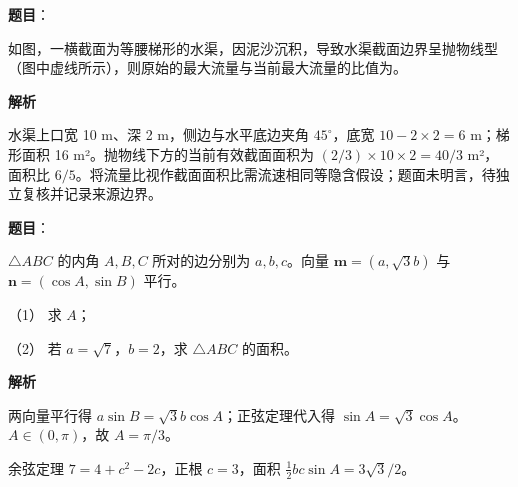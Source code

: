 \begin{answer}

\textbf{题目}：

如图，一横截面为等腰梯形的水渠，因泥沙沉积，导致水渠截面边界呈抛物线型（图中虚线所示），则原始的最大流量与当前最大流量的比值为\gkblank{}。
\nopagebreak[4]
\begin{center}\end{center}
\nopagebreak[4]
\textbf{解析}

水渠上口宽 10 m、深 2 m，侧边与水平底边夹角 $45^\circ$，底宽 $10-2\times2=6$ m；梯形面积 16 m²。抛物线下方的当前有效截面面积为 $(2/3)\times10\times2=40/3$ m²，面积比 $6/5$。将流量比视作截面面积比需流速相同等隐含假设；题面未明言，待独立复核并记录来源边界。


\end{answer}
\begin{answer}

\textbf{题目}：

$\triangle ABC$ 的内角 $A,B,C$ 所对的边分别为 $a,b,c$。向量 $\boldsymbol m=(a,\sqrt3b)$ 与 $\boldsymbol n=(\cos A,\sin B)$ 平行。

（1） 求 $A$；

（2） 若 $a=\sqrt7$，$b=2$，求 $\triangle ABC$ 的面积。

\textbf{解析}


两向量平行得 $a\sin B=\sqrt3b\cos A$；正弦定理代入得 $\sin A=\sqrt3\cos A$。$A\in(0,\pi)$，故 $A=\pi/3$。


余弦定理 $7=4+c^2-2c$，正根 $c=3$，面积 $\frac12bc\sin A=3\sqrt3/2$。



\end{answer}
